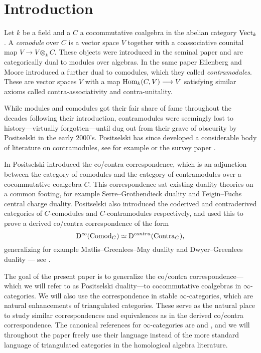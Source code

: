 
\section{Introduction}

Let $k$ be a field and a $C$ a cocommutative coalgebra in the abelian category $\mathrm{Vect}_k$. A \emph{comodule} over $C$ is a vector space $V$ together with a coassociative counital map $V\to V\otimes_k C$. These objects were introduced in the seminal paper \cite{eilenberg-moore_65} and are categorically dual to modules over algebras. In the same paper Eilenberg and Moore introduced a further dual to comodules, which they called \emph{contramodules}. These are vector spaces $V$ with a map $\operatorname{Hom}_k(C, V)\longrightarrow V$ satisfying similar axioms called contra-associativity and contra-unitality. 

While modules and comodules got their fair share of fame throughout the decades following their introduction, contramodules were seemingly lost to history---virtually forgotten---until dug out from their grave of obscurity by Positselski in the early 2000's. Positselski has since developed a considerable body of literature on contramodules, see for example \cite{positselski_2010, positselski_2011, positselski_2016, positselski_2017_contraadjusted, positselski_2020} or the survey paper \cite{positselski_2022_contramodules}. 

In \cite{positselski_2010} Positselski introduced the co/contra correspondence, which is an adjunction between the category of comodules and the category of contramodules over a cocommutative coalgebra $C$. This correspondence sat existing duality theories on a common footing, for example Serre--Grothendieck duality and Feigin--Fuchs central charge duality. Positselski also introduced the coderived and contraderived categories of $C$-comodules and $C$-contramodules respectively, and used this to prove a derived co/contra correspondence of the form 
\[\mathrm{D}^{co}(\mathrm{Comod}_C)\simeq \mathrm{D}^{contra}(\mathrm{Contra}_C),\]
generalizing for example Matlis--Greenlees--May duality and Dwyer--Greenlees duality --- see \cite{positselski_2016}. 

The goal of the present paper is to generalize the co/contra correspondence---which we will refer to as Positselski duality---to cocommutative coalgebras in $\infty$-categories. We will also use the correspondence in stable $\infty$-categories, which are natural enhancements of triangulated categories. These serve as the natural place to study similar correspondences and equivalences as in the derived co/contra correspondence. The canonical references for $\infty$-categories are \cite{lurie_09} and \cite{Lurie_HA}, and we will throughout the paper freely use their language instead of the more standard language of triangulated categories in the homological algebra literature. 





